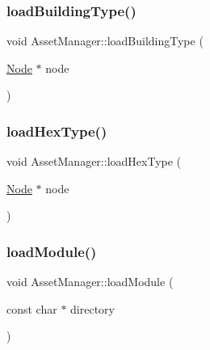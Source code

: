\mbox{\label{class_asset_manager_a586cabaf670eb3552bb3c52b7edcbc1e}} 
\subsubsection{\texorpdfstring{load\+Building\+Type()}{loadBuildingType()}}
{\footnotesize\ttfamily void Asset\+Manager\+::load\+Building\+Type (\begin{DoxyParamCaption}\item[{\hyperlink{class_asset_manager_1_1_node}{Node} $\ast$}]{node }\end{DoxyParamCaption})\hspace{0.3cm}{\ttfamily [private]}}

\mbox{\label{class_asset_manager_a6c90c782668a85ef5539bec84d6e5aac}} 
\subsubsection{\texorpdfstring{load\+Hex\+Type()}{loadHexType()}}
{\footnotesize\ttfamily void Asset\+Manager\+::load\+Hex\+Type (\begin{DoxyParamCaption}\item[{\hyperlink{class_asset_manager_1_1_node}{Node} $\ast$}]{node }\end{DoxyParamCaption})\hspace{0.3cm}{\ttfamily [private]}}

\mbox{\label{class_asset_manager_aeb708c02a513a57e9c1ac5351b3f2fa5}} 
\subsubsection{\texorpdfstring{load\+Module()}{loadModule()}}
{\footnotesize\ttfamily void Asset\+Manager\+::load\+Module (\begin{DoxyParamCaption}\item[{const char $\ast$}]{directory }\end{DoxyParamCaption})}

